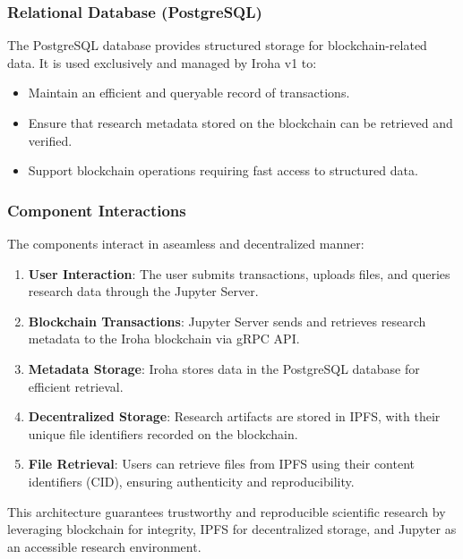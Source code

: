 \documentclass{article}
\begin{document}
\subsubsection{Relational Database (PostgreSQL)}
The PostgreSQL database provides structured storage for blockchain-related data. It is used exclusively and managed by Iroha v1 to:
\begin{itemize}
    \item Maintain an efficient and queryable record of transactions.
    \item Ensure that research metadata stored on the blockchain can be retrieved and verified.
    \item Support blockchain operations requiring fast access to structured data.
\end{itemize}

\subsubsection{Component Interactions}
The components interact in aseamless and decentralized manner:
\begin{enumerate}
    \item \textbf{User Interaction}: The user submits transactions, uploads files, and queries research data through the Jupyter Server.
    \item \textbf{Blockchain Transactions}: Jupyter Server sends and retrieves research metadata to the Iroha blockchain via gRPC API.
    \item \textbf{Metadata Storage}: Iroha stores data in the PostgreSQL database for efficient retrieval.
    \item \textbf{Decentralized Storage}: Research artifacts are stored in IPFS, with their unique file identifiers recorded on the blockchain.
    \item \textbf{File Retrieval}: Users can retrieve files from IPFS using their content identifiers (CID), ensuring authenticity and reproducibility.
\end{enumerate}

This architecture guarantees trustworthy and reproducible scientific research by leveraging blockchain for integrity, IPFS for decentralized storage, and Jupyter as an accessible research environment.
\end{document}
